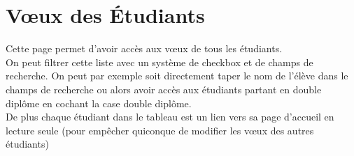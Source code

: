 \section{Vœux des Étudiants}
Cette page permet d'avoir accès aux vœux de tous les étudiants.\\
On peut filtrer cette liste avec un système de checkbox et de champs de recherche. On peut par exemple soit directement taper le nom de l'élève dans le champs de recherche ou alors avoir accès aux étudiants partant en double diplôme en cochant la case double diplôme.\\
De plus chaque étudiant dans le tableau est un lien vers sa page d'accueil en lecture seule (pour empêcher quiconque de modifier les vœux des autres étudiants)